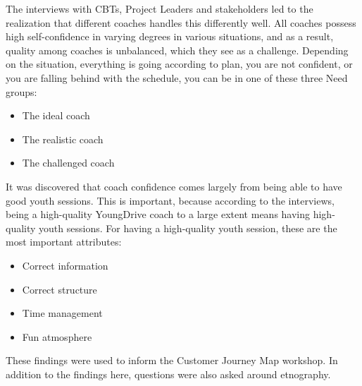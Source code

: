 


The interviews with CBTs, Project Leaders and stakeholders led to the realization that different coaches handles this differently well. All coaches possess high self-confidence in varying degrees in various situations, and as a result, quality among coaches is unbalanced, which they see as a challenge. Depending on the situation, everything is going according to plan, you are not confident, or you are falling behind with the schedule, you can be in one of these three Need groups:

\begin{itemize}
  \item The ideal coach
  \item The realistic coach
  \item The challenged coach
\end{itemize}

It was discovered that coach confidence comes largely from being able to have good youth sessions. This is important, because according to the interviews, being a high-quality YoungDrive coach to a large extent means having high-quality youth sessions. For having a high-quality youth session, these are the most important attributes:

\begin{itemize}
  \item Correct information
  \item Correct structure
  \item Time management
  \item Fun atmosphere
\end{itemize}

These findings were used to inform the Customer Journey Map workshop. In addition to the findings here, questions were also asked around etnography.

